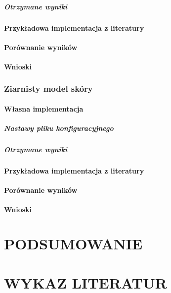\paragraph{Otrzymane wyniki}
\subsubsection{Przykładowa implementacja z literatury}
\subsubsection{Porównanie wyników}
\subsubsection{Wnioski}

\subsection{Ziarnisty model skóry}
\subsubsection{Własna implementacja}
\paragraph{Nastawy pliku konfiguracyjnego}
\paragraph{Otrzymane wyniki}
\subsubsection{Przykładowa implementacja z literatury}
\subsubsection{Porównanie wyników}
\subsubsection{Wnioski}



\chapter{PODSUMOWANIE}
\label{chpt:podsumowanie}



\chapter{WYKAZ LITERATUR}
\label{chpt:wykaz-literatur}